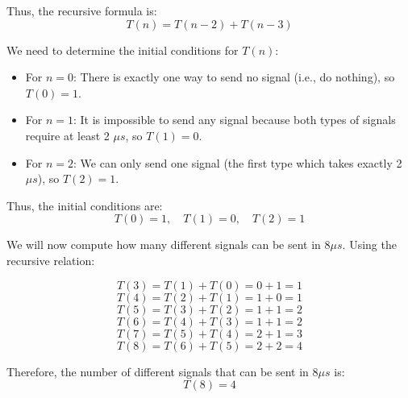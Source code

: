 \documentclass[12pt]{article}
\begin{document}
Thus, the recursive formula is:
\[
T(n) = T(n-2) + T(n-3)
\]

We need to determine the initial conditions for $T(n)$:
\begin{itemize}
    \item For $n = 0$: There is exactly one way to send no signal (i.e., do nothing), so $T(0) = 1$.
    \item For $n = 1$: It is impossible to send any signal because both types of signals require at least 2 $\mu s$, so $T(1) = 0$.
    \item For $n = 2$: We can only send one signal (the first type which takes exactly 2 $\mu s$), so $T(2) = 1$.
\end{itemize}

Thus, the initial conditions are:
\[
T(0) = 1, \quad T(1) = 0, \quad T(2) = 1
\]

We will now compute how many different signals can be sent in $8 \mu s$. Using the recursive relation:

\[
T(3) = T(1) + T(0) = 0 + 1 = 1
\]
\[
T(4) = T(2) + T(1) = 1 + 0 = 1
\]
\[
T(5) = T(3) + T(2) = 1 + 1 = 2
\]
\[
T(6) = T(4) + T(3) = 1 + 1 = 2
\]
\[
T(7) = T(5) + T(4) = 2 + 1 = 3
\]
\[
T(8) = T(6) + T(5) = 2 + 2 = 4
\]

Therefore, the number of different signals that can be sent in $8 \mu s$ is:
\[
T(8) = 4
\]
\end{document}
